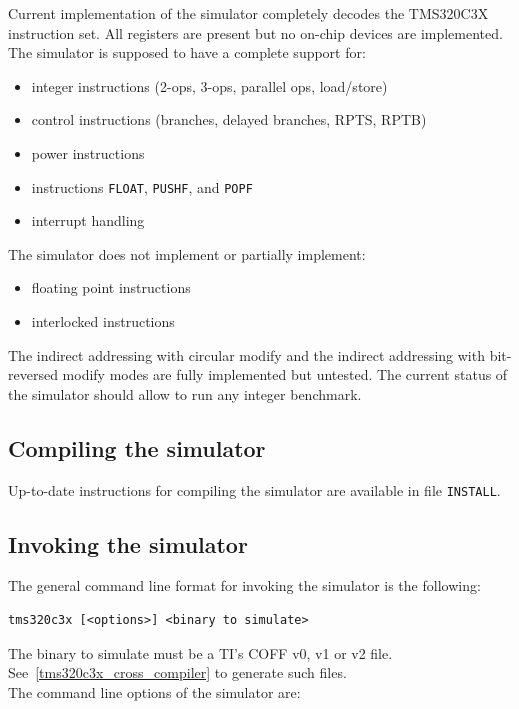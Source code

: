 Current implementation of the simulator completely decodes the TMS320C3X instruction set.
All registers are present but no on-chip devices are implemented.
The simulator is supposed to have a complete support for:
\begin{itemize}
\item integer instructions (2-ops, 3-ops, parallel ops, load/store)
\item control instructions (branches, delayed branches, RPTS, RPTB)
\item power instructions
\item instructions \texttt{FLOAT}, \texttt{PUSHF}, and \texttt{POPF}
\item interrupt handling
\end{itemize}

The simulator does not implement or partially implement:
\begin{itemize}
\item floating point instructions
\item interlocked instructions
\end{itemize}

The indirect addressing with circular modify and the indirect addressing with bit-reversed modify modes are fully implemented but untested.
The current status of the simulator should allow to run any integer benchmark.

\subsection{Compiling the simulator}

Up-to-date instructions for compiling the simulator are available in file \texttt{INSTALL}.

\subsection{Invoking the simulator}

The general command line format for invoking the simulator is the following:

\begin{verbatim}
tms320c3x [<options>] <binary to simulate>
\end{verbatim}

\noindent The binary to simulate must be a TI's COFF v0, v1 or v2 file. See~\ref{tms320c3x_cross_compiler} to generate such files.
\newline\\
\noindent The command line options of the simulator are:

